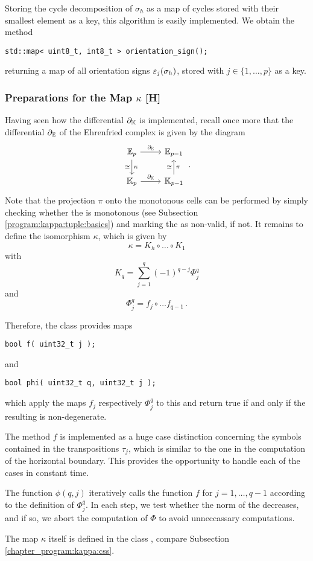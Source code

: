 Storing the cycle decomposition of $\sigma_h$ as a map of cycles stored with their smallest element as a key,
this algorithm is easily implemented.
We obtain the method
\begin{lstlisting}
std::map< uint8_t, int8_t > orientation_sign();
\end{lstlisting}
returning a map of all orientation signs $\varepsilon_j(\sigma_h)$, stored with $j \in \{1, \dotsc, p\}$ as a key.

\subsubsection{Preparations for the Map \texorpdfstring{$\kappa$}{kappa} [H]}
\label{program:kappa:tuple:prep_for_kappa}

Having seen how the differential $\partial_\mathbb K$ is implemented, 
recall once more that the differential $\partial_\mathbb E$ of the Ehrenfried complex is given by the diagram
\[
    \begin{tikzcd}
	\E_p \arrow{r}{\del_\E} \arrow{d}{\kappa}[swap]{\cong}      & \E_{p-1} \\
	\KK_p \arrow{r}{\del_\KK}                                     & \KK_{p-1} \arrow{u}{\cong}[swap]{\pi}
    \end{tikzcd}\,.
\]
Note that the projection $\pi$ onto the monotonous cells can be performed by 
simply checking whether the  is monotonous (see Subsection \ref{program:kappa:tuple:basics})
and marking the  as non-valid, if not.
It remains to define the isomorphism $\kappa$, which is given by
\[
    \kappa = K_h \circ \ldots \circ K_1
\]
with
\[
    K_q = \sum_{j=1}^q (-1)^{q-j} \Phi_{j}^q
\]
and
\[
    \Phi_j^q = f_j \circ \ldots f_{q-1} \,.
\]

Therefore, the class  provides maps
\begin{lstlisting}
bool f( uint32_t j );
\end{lstlisting}
and 
\begin{lstlisting}
bool phi( uint32_t q, uint32_t j );
\end{lstlisting}
which apply the maps $f_j$ respectively $\Phi_j^q$ to this  
and return true if and only if the resulting  is non-degenerate. 

The method $f$ is implemented as a huge case distinction 
concerning the symbols contained in the transpositions $\tau_j$,
which is similar to the one in the computation of the horizontal boundary. 
This provides the opportunity to handle each of the cases in constant time.

The function $\phi(q, j)$ iteratively calls the function $f$ for $j = 1, \dotsc, q-1$
according to the definition of $\Phi_j^q$.
In each step, we test whether the norm of the  decreases, and if so, 
we abort the computation of $\Phi$ to avoid unneccassary computations.

The map $\kappa$ itself is defined in the class , compare Subsection \ref{chapter_program:kappa:css}.